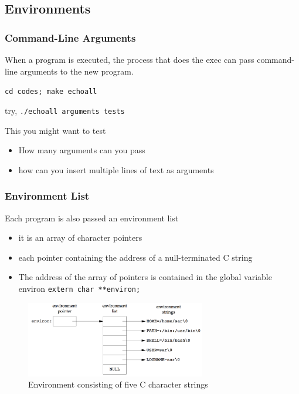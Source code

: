 \documentclass[newPxFont,sthlmFooter,nooffset]{beamer}
\begin{document}
\subsection{Environments}

\begin{frame}
  \frametitle{Command-Line Arguments}
When a program is executed, the process that does the exec can pass command-line arguments to the new program.

\texttt{cd codes; make echoall}

  

try,
\texttt{./echoall arguments tests}

This you might want to test
\begin{itemize}
\item How many arguments can you pass
\item how can you insert multiple lines of text as arguments
\end{itemize}
\end{frame}

\begin{frame}[t]
  \frametitle{Environment List}
Each program is also passed an environment list 
\begin{itemize}
\item it is an array of character pointers
\item each pointer containing the address of a null-terminated C
  string
\item The address of the array of pointers is contained in the global variable environ \texttt{extern char **environ;}
\end{itemize}

\begin{figure}[h]
  \centering
  \includegraphics[width=0.7\textwidth]{figure/fig7-5_environment.png}
  \caption{Environment consisting of five C character strings}
\end{figure}
\end{frame}
\end{document}
